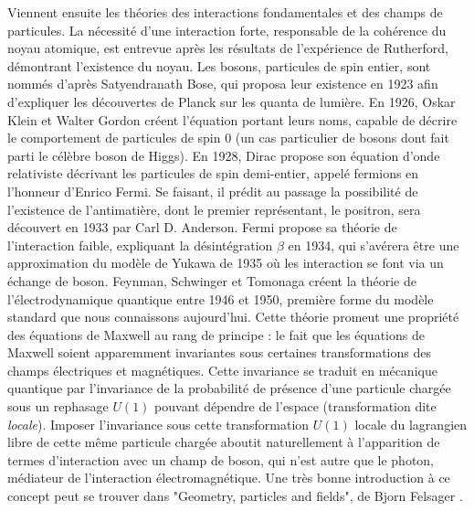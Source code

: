 		    Viennent ensuite les théories des interactions fondamentales et des champs de particules. La nécessité d'une interaction forte, responsable de la cohérence du noyau atomique, est entrevue après les résultats de l'expérience de Rutherford, démontrant l'existence du noyau. Les bosons, particules de spin entier, sont nommés d'après Satyendranath Bose, qui proposa leur existence en 1923 afin d'expliquer les découvertes de Planck sur les quanta de lumière\cite{Bose1924}. En 1926, Oskar Klein et Walter Gordon\cite{Klein1926,Gordon1926} créent l'équation portant leurs noms, capable de décrire le comportement de particules de spin 0 (un cas particulier de bosons dont fait parti le célèbre boson de Higgs). En 1928, Dirac propose son équation d'onde relativiste décrivant les particules de spin demi-entier, appelé fermions en l'honneur d'Enrico Fermi\cite{Dirac1928}. Se faisant, il prédit au passage la possibilité de l'existence de l'antimatière, dont le premier représentant, le positron, sera découvert en 1933 par Carl D. Anderson\cite{Anderson1933}. Fermi propose sa théorie de l'interaction faible, expliquant la désintégration $\beta$ en 1934\cite{Fermi1934}, qui s'avérera être une approximation du modèle de Yukawa de 1935\cite{Yukawa1935} où les interaction se font via un échange de boson. Feynman, Schwinger et Tomonaga\cite{Tomonaga1946,Schwinger1948,Feynman1998} créent la théorie de l'électrodynamique quantique entre 1946 et 1950, première forme du modèle standard que nous connaissons aujourd’hui. Cette théorie promeut une propriété des équations de Maxwell au rang de principe : le fait que les équations de Maxwell soient apparemment invariantes sous certaines transformations des champs électriques et magnétiques. Cette invariance se traduit en mécanique quantique par l'invariance de la probabilité de présence d'une particule chargée sous un rephasage $U(1)$ pouvant dépendre de l'espace (transformation dite \textit{locale}). Imposer l'invariance sous cette transformation $U(1)$ locale du lagrangien libre de cette même particule chargée aboutit naturellement à l'apparition de termes d'interaction avec un champ de boson, qui n'est autre que le photon, médiateur de l'interaction électromagnétique. Une très bonne introduction à ce concept peut se trouver dans "Geometry, particles and fields", de Bjorn Felsager \cite{felsager}.
		    
